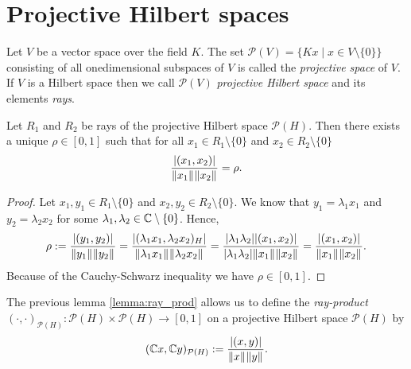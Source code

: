 \section{Projective Hilbert spaces}

\begin{definition}
	Let $V$ be a vector space over the field $K$. The set $\mathcal{P}(V) = \{Kx \mid x \in V \setminus \{0\}\}$ consisting of all onedimensional subspaces of $V$ is called the \textit{projective space} of $V$. If $V$ is a Hilbert space then we call $\mathcal{P}(V)$ \textit{projective Hilbert space} and its elements \textit{rays}.
\end{definition}


\begin{lemma} \label{lemma:ray_prod}
	Let $R_1$ and $R_2$ be rays of the projective Hilbert space $\mathcal{P}(H)$. Then there exists a unique $\rho \in [0, 1]$ such that for all $x_1 \in R_1 \setminus \{0\}$ and $x_2 \in R_2 \setminus \{0\}$
	\begin{align*}
		\frac{\vbraces{(x_1, x_2)}}{\norm[]{x_1} \norm[]{x_2}} = \rho.
	\end{align*}
\end{lemma}

\begin{proof}
	Let $x_1, y_1 \in R_1 \setminus \{0\}$ and $x_2, y_2 \in R_2 \setminus \{0\}$. We know that $y_1 = \lambda_1 x_1$ and $y_2 = \lambda_2 x_2$ for some $\lambda_1, \lambda_2 \in \C \setminus \{0\}$. Hence,
	\begin{align*}
		\rho := \frac{\vbraces{(y_1, y_2)}}{\norm[]{y_1} \norm[]{y_2}} = \frac{\vbraces{(\lambda_1 x_1, \lambda_2 x_2)_H}}{\norm[]{\lambda_1 x_1} \norm[]{\lambda_2 x_2}} = \frac{\vbraces{\lambda_1 \lambda_2}\vbraces{(x_1, x_2)}}{\vbraces{\lambda_1 \lambda_2}\norm[]{x_1} \norm[]{x_2}} = \frac{\vbraces{(x_1, x_2)}}{\norm[]{x_1} \norm[]{x_2}}.
	\end{align*}
	Because of the Cauchy-Schwarz inequality we have $\rho \in [0,1]$. 
\end{proof}


\begin{definition}
	The previous lemma \ref{lemma:ray_prod} allows us to define the \textit{ray-product} $(\cdot, \cdot)_{\mathcal{P}(H)}: \mathcal{P}(H) \times \mathcal{P}(H) \to [0,1]$ on a projective Hilbert space $\mathcal{P}(H)$ by
	\begin{align*}
		 (\C x, \C y)_{\mathcal{P}(H)} := \frac{\vbraces{(x, y)}}{\norm[]{x} \norm[]{y}}.
	\end{align*}
\end{definition}


